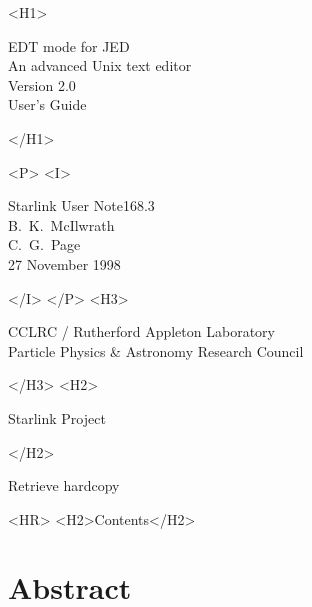 \documentclass[twoside,11pt]{article}
\newcommand{\stardoccategory}   {Starlink User Note}
\newcommand{\stardocsource}     {sun\stardocnumber}
\newcommand{\stardocnumber}     {168.3}
\newcommand{\stardocauthors}    {B.\ K.\ McIlwrath\\C.\ G.\ Page}
\newcommand{\stardocversion}    {Version 2.0}
\newcommand{\stardocdate}       {27 November 1998}
\newcommand{\stardoctitle}      {EDT mode for JED\\[2ex]
                                An advanced Unix text editor}
\newcommand{\stardocmanual}    {User's Guide}
\newcommand{\htmladdnormallink}[2]{#1}
\newcommand{\htmladdimg}[1]{}
\newcommand{\htmlref}[2]{#1}
\newcommand{\htmladdtonavigation}[1]{}
\newcommand{\xlabel}[1]{}
\newcommand{\latexonlytoc}[0]{\tableofcontents}
\begin{document}
\begin{htmlonly}
   \xlabel{}
   \begin{rawhtml} <H1> \end{rawhtml}
      \stardoctitle\\
      \stardocversion\\
      \stardocmanual
   \begin{rawhtml} </H1> \end{rawhtml}


   \begin{rawhtml} <P> <I> \end{rawhtml}
   \stardoccategory \stardocnumber \\
   \stardocauthors \\
   \stardocdate
   \begin{rawhtml} </I> </P> <H3> \end{rawhtml}
      \htmladdnormallink{CCLRC}{http://www.cclrc.ac.uk} /
      \htmladdnormallink{Rutherford Appleton Laboratory}
                        {http://www.cclrc.ac.uk/ral} \\
      \htmladdnormallink{Particle Physics \& Astronomy Research Council}
                        {http://www.pparc.ac.uk} \\
   \begin{rawhtml} </H3> <H2> \end{rawhtml}
      \htmladdnormallink{Starlink Project}{http://star-www.rl.ac.uk/}
   \begin{rawhtml} </H2> \end{rawhtml}
   \htmladdnormallink{\htmladdimg{source.gif} Retrieve hardcopy}
      {http://star-www.rl.ac.uk/cgi-bin/hcserver?\stardocsource}\\

  \label{stardoccontents}
  \begin{rawhtml} 
    <HR>
    <H2>Contents</H2>
  \end{rawhtml}
  \renewcommand{\latexonlytoc}[0]{}
  \htmladdtonavigation{\htmlref{\htmladdimg{contents_motif.gif}}
        {stardoccontents}}

  \section{\xlabel{abstract}Abstract}
\end{htmlonly}
\end{document}
